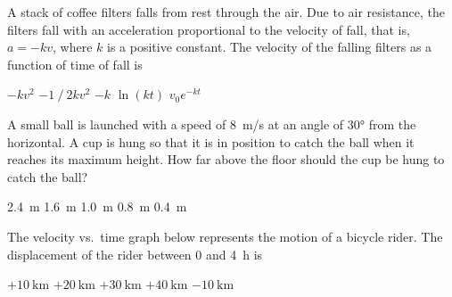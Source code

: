 \documentclass{../../../oss-classkick-exam}
\begin{document}
\begin{multicols*}{2}
\begin{questions}
    \question A stack of coffee filters falls from rest through the air. Due to
    air resistance, the filters fall with an acceleration proportional to the
    velocity of fall, that is, $a=-kv$, where $k$ is a positive constant. The
    velocity of the falling filters as a function of time of fall is
    \begin{choices}
      \choice $-kv^2$
      \choice $-1⁄2kv^2$
      \choice $-k$
      \choice $\ln(kt)$
      \choice $v_0e^{-kt}$
    \end{choices}
    
    \question A small ball is launched with a speed of \SI{8}{m/s} at an angle
    of \ang{30} from the horizontal. A cup is hung so that it is in position to
    catch the ball when it reaches its maximum height. How far above the floor
    should the cup be hung to catch the ball?    
    \begin{choices}
      \choice\SI{2.4}{\metre}
      \choice\SI{1.6}{\metre}
      \choice\SI{1.0}{\metre}
      \choice\SI{.8}{\metre}
      \choice\SI{.4}{\metre}
    \end{choices}
  
    \question The velocity vs.\ time graph below represents the motion of a
    bicycle rider. The displacement of the rider between $0$ and \SI{4}{\hour}
    is
    \begin{center}
    \end{center}
    \begin{choices}
      \choice $+\SI{10}{\kilo\metre}$
      \choice $+\SI{20}{\kilo\metre}$
      \choice $+\SI{30}{\kilo\metre}$
      \choice $+\SI{40}{\kilo\metre}$
      \choice $-\SI{10}{\kilo\metre}$
    \end{choices}

\end{questions}
\end{multicols*}
\end{document}
